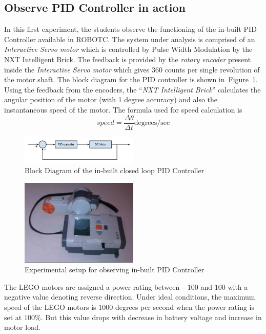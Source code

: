 \documentclass[paper=a4, fontsize=11pt]{scrartcl}
\numberwithin{equation}{section}        %
\numberwithin{figure}{section}          %
\numberwithin{table}{section}           %
\begin{document}
\subsection{Observe PID Controller in action}
In this first experiment, the students observe the functioning of the in-built PID Controller available in ROBOTC. The system under analysis is comprised of an \emph{Interactive Servo motor} which is controlled by Pulse Width Modulation by the NXT Intelligent Brick. The feedback is provided by the \emph{rotary encoder} present inside the \emph{Interactive Servo motor} which gives 360 counts per single revolution of the motor shaft. The block diagram for the PID controller is shown in~Figure~\ref{fig:block_diagram}. Using the feedback from the encoders, the ``\emph{NXT Intelligent Brick}'' calculates the angular position of the motor (with 1 degree accuracy) and also the instantaneous speed of the motor. The formula used for speed calculation is
\begin{equation}
speed = \frac{\Delta\theta}{\Delta{}t} \text{degrees/sec}
\end{equation}
\begin{figure}[!hbp]
	\includegraphics[width=0.5\textwidth]{block_diagram}
	\caption{Block Diagram of the in-built closed loop PID Controller}
	\label{fig:block_diagram}
\end{figure}

\begin{figure}[!hbp]
	\includegraphics[width=0.5\textwidth]{setup}
	\caption{Experimental setup for observing in-built PID Controller}
	\label{fig:setup}
\end{figure}

The LEGO motors are assigned a power rating between $-100$ and $100$ with a negative value denoting reverse direction. Under ideal conditions, the maximum speed of the LEGO motors is $1000$ degrees per second when the power rating is set at $100\%$. But this value drops with decrease in battery voltage and increase in motor load. 
\end{document}
